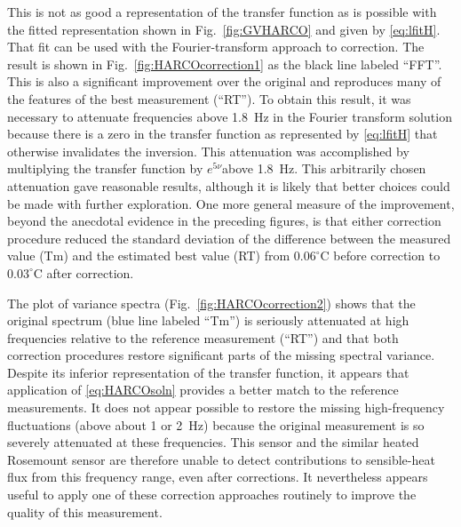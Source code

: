 \documentclass[11pt,twoside,american,12pt,twoside,american]{article}\usepackage[]{graphicx}\usepackage[]{color}
\begin{document}
This is not as good a representation of the transfer function as is
possible with the fitted representation shown in Fig.~\ref{fig:GVHARCO}
and given by \eqref{eq:lfitH}. That fit can be used with the Fourier-transform
approach to correction. The result is shown in Fig.~\ref{fig:HARCOcorrection1}
as the black line labeled ``FFT''. This is also a significant improvement
over the original and reproduces many of the features of the best
measurement (``RT''). To obtain this result, it was necessary to
attenuate frequencies above 1.8~Hz in the Fourier transform solution
because there is a zero in the transfer function as represented by
\eqref{eq:lfitH} that otherwise invalidates the inversion. This attenuation
was accomplished by multiplying the transfer function by $e^{5\nu}$above
1.8~Hz. This arbitrarily chosen attenuation gave reasonable results,
although it is likely that better choices could be made with further
exploration. One more general measure of the improvement, beyond the
anecdotal evidence in the preceding figures, is that either correction
procedure reduced the standard deviation of the difference between
the measured value (Tm) and the estimated best value (RT) from $0.06^{\circ}$C
before correction to $0.03^{\circ}$C after correction.

The plot of variance spectra (Fig.~\ref{fig:HARCOcorrection2}) shows
that the original spectrum (blue line labeled ``Tm'') is seriously
attenuated at high frequencies relative to the reference measurement
(``RT'') and that both correction procedures restore significant
parts of the missing spectral variance. Despite its inferior representation
of the transfer function, it appears that application of \ref{eq:HARCOsoln}
provides a better match to the reference measurements. It does not
appear possible to restore the missing high-frequency fluctuations
(above about 1 or 2~Hz) because the original measurement is so severely
attenuated at these frequencies. This sensor and the similar heated
Rosemount sensor are therefore unable to detect contributions to sensible-heat
flux from this frequency range, even after corrections. It nevertheless
appears useful to apply one of these correction approaches routinely
to improve the quality of this measurement.
\end{document}
